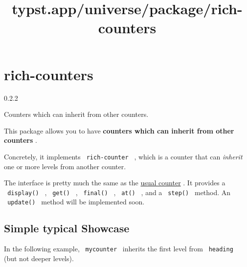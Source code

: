 \title{typst.app/universe/package/rich-counters}

\label{banner}
\section{rich-counters}\label{rich-counters}

{ 0.2.2 }

Counters which can inherit from other counters.

\label{readme}
This package allows you to have \textbf{counters which can inherit from
other counters} .

Concretely, it implements \texttt{\ rich-counter\ } , which is a counter
that can \emph{inherit} one or more levels from another counter.

The interface is pretty much the same as the
\href{https://typst.app/docs/reference/introspection/counter/}{usual
counter} . It provides a \texttt{\ display()\ } , \texttt{\ get()\ } ,
\texttt{\ final()\ } , \texttt{\ at()\ } , and a \texttt{\ step()\ }
method. An \texttt{\ update()\ } method will be implemented soon.

\subsection{Simple typical Showcase}\label{simple-typical-showcase}

In the following example, \texttt{\ mycounter\ } inherits the first
level from \texttt{\ heading\ } (but not deeper levels).

